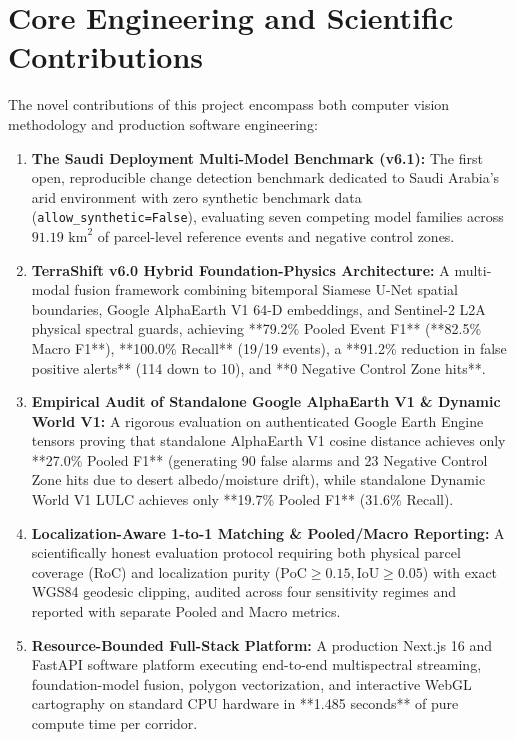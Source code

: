 \section{Core Engineering and Scientific Contributions}
\label{sec:intro_contributions}
The novel contributions of this project encompass both computer vision methodology and production software engineering:

\begin{enumerate}
    \item \textbf{The Saudi Deployment Multi-Model Benchmark (v6.1):} The first open, reproducible change detection benchmark dedicated to Saudi Arabia's arid environment with zero synthetic benchmark data (\texttt{allow\_synthetic=False}), evaluating seven competing model families across $91.19\text{ km}^2$ of parcel-level reference events and negative control zones.
    \item \textbf{TerraShift v6.0 Hybrid Foundation-Physics Architecture:} A multi-modal fusion framework combining bitemporal Siamese U-Net spatial boundaries, Google AlphaEarth V1 64-D embeddings, and Sentinel-2 L2A physical spectral guards, achieving **79.2\% Pooled Event F1** (**82.5\% Macro F1**), **100.0\% Recall** (19/19 events), a **91.2\% reduction in false positive alerts** (114 down to 10), and **0 Negative Control Zone hits**.
    \item \textbf{Empirical Audit of Standalone Google AlphaEarth V1 & Dynamic World V1:} A rigorous evaluation on authenticated Google Earth Engine tensors proving that standalone AlphaEarth V1 cosine distance achieves only **27.0\% Pooled F1** (generating 90 false alarms and 23 Negative Control Zone hits due to desert albedo/moisture drift), while standalone Dynamic World V1 LULC achieves only **19.7\% Pooled F1** (31.6\% Recall).
    \item \textbf{Localization-Aware 1-to-1 Matching & Pooled/Macro Reporting:} A scientifically honest evaluation protocol requiring both physical parcel coverage ($\text{RoC}$) and localization purity ($\text{PoC} \ge 0.15, \text{IoU} \ge 0.05$) with exact WGS84 geodesic clipping, audited across four sensitivity regimes and reported with separate Pooled and Macro metrics.
    \item \textbf{Resource-Bounded Full-Stack Platform:} A production Next.js 16 and FastAPI software platform executing end-to-end multispectral streaming, foundation-model fusion, polygon vectorization, and interactive WebGL cartography on standard CPU hardware in **1.485 seconds** of pure compute time per corridor.
\end{enumerate}

